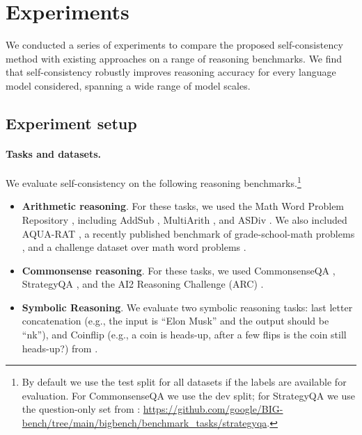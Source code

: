 \section{Experiments}
We conducted a series of experiments to compare the proposed self-consistency method with existing approaches on a range of reasoning benchmarks. We find that self-consistency robustly improves reasoning accuracy for every language model considered, spanning a wide range of model scales.  

\subsection{Experiment setup}

\paragraph{Tasks and datasets.} We evaluate self-consistency on the following reasoning benchmarks.\footnote{By default we use the test split for all datasets if the labels are available for evaluation. For CommonsenseQA we use the dev split; for StrategyQA we use the question-only set from \cite{bigbench}: \scriptsize{\url{https://github.com/google/BIG-bench/tree/main/bigbench/benchmark_tasks/strategyqa}}.}

\begin{itemize}[leftmargin=0.6cm]
    \item \textbf{Arithmetic reasoning}. For these tasks, we used the Math Word Problem Repository \citep{koncel-kedziorski-etal-2016-mawps}, including AddSub \citep{hosseini-etal-2014-learning}, MultiArith \citep{roy-roth-2015-solving}, and ASDiv \citep{miao-etal-2020-diverse}. We also included AQUA-RAT \citep{ling-etal-2017-program}, a recently published benchmark of grade-school-math problems \citep[GSM8K;][]{cobbe2021training}, and a challenge dataset over math word problems \citep[SVAMP;][]{patel-etal-2021-nlp}.
    \item \textbf{Commonsense reasoning}. For these tasks, we used CommonsenseQA \citep{talmor-etal-2019-commonsenseqa}, StrategyQA \citep{geva-etal-2021-aristotle}, and the AI2 Reasoning Challenge (ARC) \citep{Clark2018ThinkYH}.

    \item \textbf{Symbolic Reasoning}. We evaluate two symbolic reasoning tasks: last letter concatenation (e.g., the input is ``Elon Musk'' and the output should be ``nk''), and Coinflip (e.g., a coin is heads-up, after a few flips is the coin still heads-up?) from \cite{wei2022chain}. 
\end{itemize}

